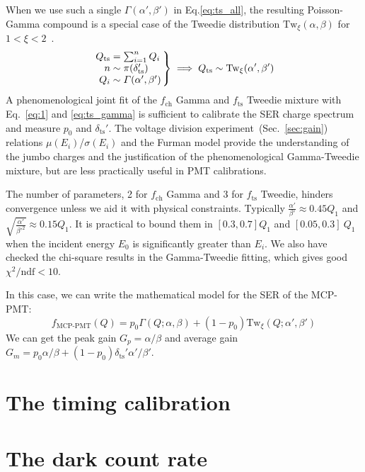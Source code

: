 When we use such a single \(\varGamma(\alpha', \beta')\) in Eq.\eqref{eq:ts_all},
the resulting Poisson-Gamma compound is a special case of the Tweedie distribution $\mathrm{Tw}_{\xi}(\alpha,\beta)$
for $1<\xi<2$~\cite{1991Tweedie}.
\begin{equation}
	\arraycolsep=1.4pt
	\label{eq:ts_gamma}
	\left.\begin{array}{rl}
		Q_{\text{ts}} & = \sum_{{i}=1}^{n} Q_{i}                 \\
		n             & \sim \mathrm{\pi}(\delta_{\mathrm{ts}}') \\
		Q_{i}         & \sim \varGamma(\alpha', \beta')
	\end{array}\right\} \implies
	Q_{\text{ts}} \sim \mathrm{Tw}_{\xi}(\alpha',\beta')
\end{equation}
A phenomenological joint fit of the \(f_\mathrm{ch}\) Gamma and \(f_\mathrm{ts}\) Tweedie
mixture with Eq.~\eqref{eq:1} and \eqref{eq:ts_gamma} is sufficient to calibrate the SER charge spectrum and measure \(p_0\) and \(\delta_\text{ts}'\).
The voltage division experiment~(Sec.~\ref{sec:gain}) relations \(\mu(E_i)\)/\(\sigma(E_i)\) and the Furman model provide the understanding of the jumbo charges and the justification of the phenomenological Gamma-Tweedie
mixture, but are less practically useful in PMT calibrations.

The number of parameters, 2 for \(f_\mathrm{ch}\) Gamma and 3 for \(f_\mathrm{ts}\) Tweedie,
hinders convergence unless we aid it with physical constraints.
Typically $\frac{\alpha'}{\beta'}\approx 0.45Q_1$ and \(\sqrt{\frac{\alpha'}{\beta'^2}}\approx 0.15Q_1\).
It is practical to bound them in $[0.3,0.7]Q_1$ and $[0.05,0.3]~Q_1$ when the incident energy $E_0$ is significantly greater than $E_{i}$.
We also have checked the chi-square results in the Gamma-Tweedie fitting,
which gives good $\chi^2/\mathrm{ndf}<10$.

In this case, we can write the mathematical model for the SER of the MCP-PMT:
\begin{equation}
	\label{eq:GTmodel}
	f_{\text{MCP-PMT}}(Q) = p_0 \varGamma(Q; \alpha, \beta) + (1-p_0) \mathrm{Tw}_{\xi}(Q; \alpha', \beta')
\end{equation}
We can get the peak gain $G_p=\alpha/\beta$ and average gain $G_m=p_0\alpha/\beta+(1-p_0)\delta_{\mathrm{ts}}'\alpha'/\beta'$.

\section{The timing calibration}

\section{The dark count rate}